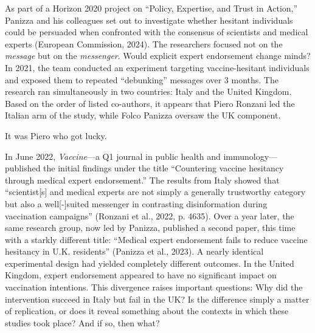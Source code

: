 \documentclass[authordate, empirical]{jote-new-article}
\begin{document}
	As part of a Horizon 2020 project on “Policy, Expertise, and Trust in Action,” Panizza and his colleagues set out to investigate whether hesitant individuals could be persuaded when confronted with the consensus of scientists and medical experts (European Commission, 2024). The researchers focused not on the \emph{message} but on the \emph{messenger}. Would explicit expert endorsement change minds? In 2021, the team conducted an experiment targeting vaccine-hesitant individuals and exposed them to repeated “debunking” messages over 3 months. The research ran simultaneously in two countries: Italy and the United Kingdom. Based on the order of listed co-authors, it appears that Piero Ronzani led the Italian arm of the study, while Folco Panizza oversaw the UK component.







	It was Piero who got lucky.







	In June 2022, \emph{Vaccine}—a Q1 journal in public health and immunology—published the initial findings under the title “Countering vaccine hesitancy through medical expert endorsement.” The results from Italy showed that “scientist[s] and medical experts are not simply a generally trustworthy category but also a well[-]suited messenger in contrasting disinformation during vaccination campaigns” (Ronzani et al., 2022, p. 4635). Over a year later, the same research group, now led by Panizza, published a second paper, this time with a starkly different title: “Medical expert endorsement fails to reduce vaccine hesitancy in U.K. residents” (Panizza et al., 2023). A nearly identical experimental design had yielded completely different outcomes. In the United Kingdom, expert endorsement appeared to have no significant impact on vaccination intentions. This divergence raises important questions: Why did the intervention succeed in Italy but fail in the UK? Is the difference simply a matter of replication, or does it reveal something about the contexts in which these studies took place? And if so, then what?
\end{document}
